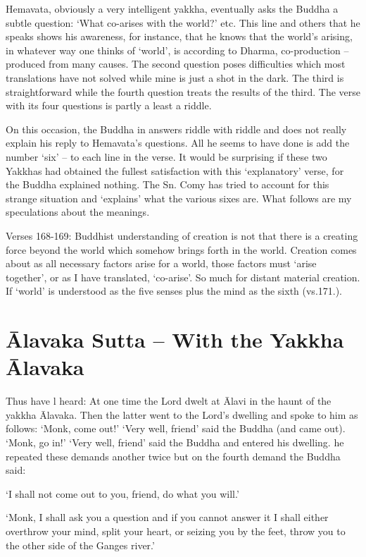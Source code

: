 Hemavata, obviously a very intelligent yakkha, eventually asks the Buddha a subtle question: `What co-arises with the world?' etc. This line and others that he speaks shows his awareness, for instance, that he knows that the world's arising, in whatever way one thinks of `world', is according to Dharma, co-production – produced from many causes. The second question poses difficulties which most translations have not solved while mine is just a shot in the dark. The third is straightforward while the fourth question treats the results of the third. The verse with its four questions is partly a least a riddle.
   
On this occasion, the Buddha in answers riddle with riddle and does not really explain his reply to Hemavata's questions. All he seems to have done is add the number `six' – to each line in the verse. It would be surprising if these two Yakkhas had obtained the fullest satisfaction with this `explanatory' verse, for the Buddha explained nothing. The Sn. Comy has tried to account for this strange situation and `explains' what the various sixes are. What follows are my speculations about the meanings.
   
Verses 168-169: Buddhist understanding of creation is not that there is a creating force beyond the world which somehow brings forth in the world. Creation comes about as all necessary factors arise for a world, those factors must `arise together', or as I have translated, `co-arise'. So much for distant material creation. If `world' is understood as the five senses plus the mind as the sixth (vs.171.).
   
    
   
    
 \chapter{\=Alavaka Sutta -- With the Yakkha \=Alavaka}
    
Thus have l heard:
At one time the Lord dwelt at \=Alavi in the haunt of the yakkha \=Alavaka. Then the latter went to the Lord's dwelling and spoke to him as follows: `Monk, come out!' `Very well, friend' said the Buddha (and came out). `Monk, go in!'
   `Very well, friend' said the Buddha and entered his dwelling. he repeated these demands another twice but on the fourth demand the Buddha said: 
   
`I shall not come out to you, friend, do what you will.' 
   
`Monk, I shall ask you a question and if you cannot answer it I shall either overthrow your mind, split your heart, or seizing you by the feet, throw you to the other side of the Ganges river.'
   

